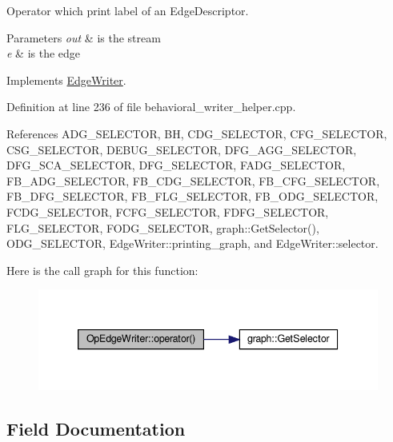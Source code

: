 Operator which print label of an Edge\+Descriptor. 


\begin{DoxyParams}{Parameters}
{\em out} & is the stream \\
\hline
{\em e} & is the edge \\
\hline
\end{DoxyParams}


Implements \hyperlink{classEdgeWriter_a04dc5b68a11dcf253e21d29dfd1e06c3}{Edge\+Writer}.



Definition at line 236 of file behavioral\+\_\+writer\+\_\+helper.\+cpp.



References A\+D\+G\+\_\+\+S\+E\+L\+E\+C\+T\+OR, BH, C\+D\+G\+\_\+\+S\+E\+L\+E\+C\+T\+OR, C\+F\+G\+\_\+\+S\+E\+L\+E\+C\+T\+OR, C\+S\+G\+\_\+\+S\+E\+L\+E\+C\+T\+OR, D\+E\+B\+U\+G\+\_\+\+S\+E\+L\+E\+C\+T\+OR, D\+F\+G\+\_\+\+A\+G\+G\+\_\+\+S\+E\+L\+E\+C\+T\+OR, D\+F\+G\+\_\+\+S\+C\+A\+\_\+\+S\+E\+L\+E\+C\+T\+OR, D\+F\+G\+\_\+\+S\+E\+L\+E\+C\+T\+OR, F\+A\+D\+G\+\_\+\+S\+E\+L\+E\+C\+T\+OR, F\+B\+\_\+\+A\+D\+G\+\_\+\+S\+E\+L\+E\+C\+T\+OR, F\+B\+\_\+\+C\+D\+G\+\_\+\+S\+E\+L\+E\+C\+T\+OR, F\+B\+\_\+\+C\+F\+G\+\_\+\+S\+E\+L\+E\+C\+T\+OR, F\+B\+\_\+\+D\+F\+G\+\_\+\+S\+E\+L\+E\+C\+T\+OR, F\+B\+\_\+\+F\+L\+G\+\_\+\+S\+E\+L\+E\+C\+T\+OR, F\+B\+\_\+\+O\+D\+G\+\_\+\+S\+E\+L\+E\+C\+T\+OR, F\+C\+D\+G\+\_\+\+S\+E\+L\+E\+C\+T\+OR, F\+C\+F\+G\+\_\+\+S\+E\+L\+E\+C\+T\+OR, F\+D\+F\+G\+\_\+\+S\+E\+L\+E\+C\+T\+OR, F\+L\+G\+\_\+\+S\+E\+L\+E\+C\+T\+OR, F\+O\+D\+G\+\_\+\+S\+E\+L\+E\+C\+T\+OR, graph\+::\+Get\+Selector(), O\+D\+G\+\_\+\+S\+E\+L\+E\+C\+T\+OR, Edge\+Writer\+::printing\+\_\+graph, and Edge\+Writer\+::selector.

Here is the call graph for this function\+:
\nopagebreak
\begin{figure}[H]
\begin{center}
\leavevmode
\includegraphics[width=339pt]{d2/df0/classOpEdgeWriter_af4383267715e988b7eaa5468ad6023fb_cgraph}
\end{center}
\end{figure}


\subsection{Field Documentation}
\mbox{\label{classOpEdgeWriter_a8713fbf90eb090855599df506347c930}} 
